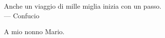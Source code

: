 
\cleardoublepage
{}
\thispagestyle{empty}

\vspace*{3cm}

\begin{center}
 Anche un viaggio di mille miglia inizia con un passo. \\ \medskip
--- Confucio    
\end{center}

\medskip

\begin{center}
A mio nonno Mario.
\end{center}
